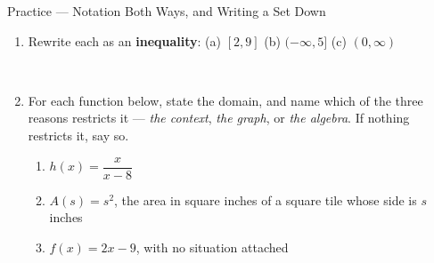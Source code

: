 \documentclass[10pt]{article}
\begin{document}
\begin{notesbox}{Practice --- Notation Both Ways, and Writing a Set Down}
\begin{enumerate}[leftmargin=1.6em, itemsep=6pt, topsep=4pt]
\item Rewrite each as an \textbf{inequality}: \quad (a) $[2,9]$ \quad (b) $(-\infty, 5]$
\quad (c) $(0, \infty)$

\\

\item For each function below, state the domain, and name which of the three reasons restricts it
--- \emph{the context}, \emph{the graph}, or \emph{the algebra}. If nothing restricts it, say so.
\begin{enumerate}[label=(\alph*), leftmargin=1.6em, itemsep=3pt, topsep=3pt]
  \item $h(x)=\dfrac{x}{x-8}$
  \item $A(s)=s^2$, the area in square inches of a square tile whose side is $s$ inches
  \item $f(x)=2x-9$, with no situation attached
\end{enumerate}

\\
\\
\\

\end{enumerate}
\end{notesbox}

\vspace{0.10in}
\end{document}
